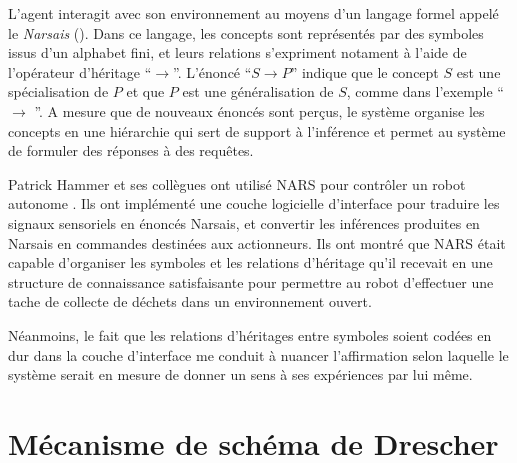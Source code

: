 L'agent interagit avec son environnement au moyens d'un langage formel appelé le \emph{Narsais} ().
Dans ce langage, les concepts sont représentés par des symboles issus d'un alphabet fini, et leurs relations s'expriment notament à l'aide de l'opérateur d'héritage ``$\rightarrow$''.
L'énoncé ``$S \rightarrow P $'' indique que le concept $S$ est une spécialisation de $P$ et que $P$ est une généralisation de $S$, comme dans l'exemple `` $\rightarrow$ ''.
A mesure que de nouveaux énoncés sont perçus, le système organise les concepts en une hiérarchie qui sert de support à l'inférence et permet au système de formuler des réponses à des requêtes. 

Patrick Hammer et ses collègues ont utilisé NARS pour contrôler un robot autonome \cite{hammer_non-axiomatic_2024}. 
Ils ont implémenté une couche logicielle d'interface pour traduire les signaux sensoriels en énoncés Narsais, et convertir les inférences produites en Narsais en commandes destinées aux actionneurs.  
Ils ont montré que NARS était capable d'organiser les symboles et les relations d'héritage qu'il recevait en une structure de connaissance satisfaisante pour permettre au robot d'effectuer une tache de collecte de déchets dans un environnement ouvert. 

Néanmoins, le fait que les relations d'héritages entre symboles soient codées en dur dans la couche d'interface me conduit à nuancer l'affirmation selon laquelle le système serait en mesure de donner un sens à ses expériences par lui même. 





\section{Mécanisme de schéma de Drescher}
\label{sec:drescher}

